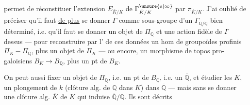 permet de réconstituer l'extension $E_{\bar K/K}$ de $\Gamma^{\unsure{a|\infty}}_{\bar K/K}$ par $\pi_{\bar K/K}$. J'ai oublié de préciser qu'il faut \uline{de plus} se donner $\Gamma$ comme sous-groupe d'un $\Gamma_{\overline{\mathbb Q}/\mathbb Q}$ bien déterminé, i.e. qu'il faut se donner un objet de $\Pi_{\mathbb Q}$ et une action fidèle de $\Gamma$ dessus --- pour reconstruire par l' de ces données un hom de groupoïdes profinis $\Pi_K-\Pi_{\mathbb Q}$, plus un objet de $\Pi_K$ --- ou encore, un morphisme de topos pro-galoisiens $B_K\longrightarrow B_{\mathbb Q}$, plus un pt de $B_K$.

On peut aussi fixer un objet de $\Pi_{\mathbb Q}$, i.e. un pt de $B_{\mathbb Q}$, i.e. un $\overline{\mathbb Q}$, et étudier les $K$,  un plongement de $k$ (clôture alg. de $\mathbb Q$ dans $K$) dans $\overline{\mathbb Q}$ ---  mais sans se donner une clôture alg. $\bar K$ de $K$ qui induise $\overline{\mathbb Q}/\mathbb Q$. Ils sont décrits
